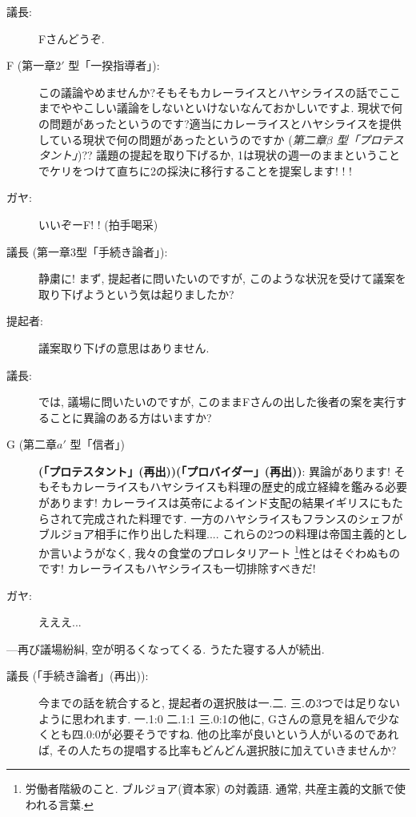 \documentclass[10pt,b5jsbook,dvips,dvipdfmx,openany]{jsbook}
\theoremstyle{definition}
\begin{document}
\begin{multicols}{2}
\begin{description}
		\item[議長: ]Fさんどうぞ. 

		\item[F (第一章$2'$ 型「一揆指導者」): ]この議論やめませんか?そもそもカレーライスとハヤシライスの話でここまでややこしい議論をしないといけないなんておかしいですよ. 現状で何の問題があったというのです?適当にカレーライスとハヤシライスを提供している現状で何の問題があったというのですか (\emph{第二章$ \beta $ 型「プロテスタント」})?? 議題の提起を取り下げるか, 1は現状の週一のままということでケリをつけて直ちに2の採決に移行することを提案します! ! ! 

		\item[ガヤ: ]いいぞーF! !  (拍手喝采)

		\item[議長 (第一章3型「手続き論者」): ]静粛に! まず, 提起者に問いたいのですが, このような状況を受けて議案を取り下げようという気は起りましたか?

		\item[提起者: ]議案取り下げの意思はありません. 

		\item[議長: ]では, 議場に問いたいのですが, このままFさんの出した後者の案を実行することに異論のある方はいますか?

		\item[G (第二章$a'$ 型「信者」)]\textbf{(「プロテスタント」(再出))(「プロバイダー」(再出))}: 異論があります! そもそもカレーライスもハヤシライスも料理の歴史的成立経緯を鑑みる必要があります! カレーライスは英帝によるインド支配の結果イギリスにもたらされて完成された料理です. 一方のハヤシライスもフランスのシェフがブルジョア相手に作り出した料理.... これらの2つの料理は帝国主義的としか言いようがなく, 我々の食堂のプロレタリアート \footnote{労働者階級のこと. ブルジョア(資本家) の対義語. 通常, 共産主義的文脈で使われる言葉. }性とはそぐわぬものです! カレーライスもハヤシライスも一切排除すべきだ! 

		\item[ガヤ: ]えええ...

		\end{description}

		---再び議場紛糾, 空が明るくなってくる. うたた寝する人が続出. 

		\begin{description}

		\item[議長 (「手続き論者」(再出)): ]今までの話を統合すると, 提起者の選択肢は一.二. 三.の3つでは足りないように思われます. 一.1:0 二.1:1 三.0:1の他に, Gさんの意見を組んで少なくとも四.0:0が必要そうですね. 他の比率が良いという人がいるのであれば, その人たちの提唱する比率もどんどん選択肢に加えていきませんか?


\end{description}
\end{multicols}
\end{document}
